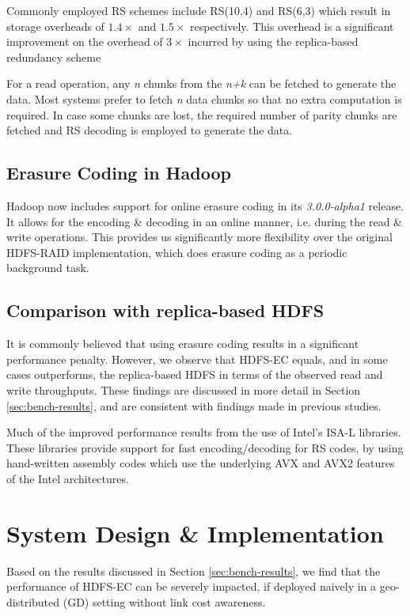 \documentclass{sig-alternate-05-2015}
\begin{document}
Commonly employed RS schemes include RS(10,4) and RS(6,3) which result in storage overheads of $1.4\times $ and $1.5\times $ respectively. This overhead is a significant improvement on the overhead of $3\times $ incurred by using the replica-based redundancy scheme

For a read operation, any \emph{n} chunks from the \emph{n+k} can be fetched to generate the data. Most systems prefer to fetch \emph{n} data chunks so that no extra computation is required. In case some chunks are lost, the required number of parity chunks are fetched and RS decoding is employed to generate the data.

\subsection{Erasure Coding in Hadoop}
Hadoop now includes support for online erasure coding in its \emph{3.0.0-alpha1} release\cite{hdfs-ec}. It allows for the encoding \& decoding in an online manner, i.e. during the read \& write operations. This provides us significantly more flexibility over the original HDFS-RAID\cite{hdfs-raid} implementation, which does erasure coding as a periodic background task.

\subsection{Comparison with replica-based HDFS}
It is commonly believed that using erasure coding results in a significant performance penalty. However, we observe that HDFS-EC equals, and in some cases outperforms, the replica-based HDFS in terms of the observed read and write throughputs. These findings are discussed in more detail in Section \ref{sec:bench-results}, and are consistent with findings made in previous studies\cite{cloudera-blog}.

Much of the improved performance results from the use of Intel's ISA-L libraries\cite{isa-l}. These libraries provide support for fast encoding/decoding for RS codes, by using hand-written assembly codes which use the underlying AVX and AVX2 features of the Intel architectures.

\section{System Design \& Implementation}
Based on the results discussed in Section \ref{sec:bench-results}, we find that the performance of HDFS-EC can be severely impacted, if deployed naively in a geo-distributed (GD) setting without link cost awareness. 
\end{document}
